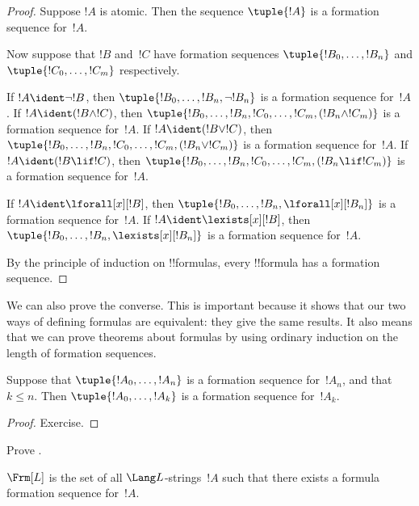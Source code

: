 \begin{proof}
Suppose $!A$ is atomic. Then the sequence $\tuple{!A}$ is a
formation sequence for~$!A$.

Now suppose that $!B$ and~$!C$ have formation sequences
$\tuple{!B_0,\dotsc,!B_n}$ and $\tuple{!C_0,\dotsc,!C_m}$
respectively.

\begin{enumerate}
  If $!A \ident \lnot !B$,
      then $\tuple{!B_0,\dotsc,!B_n,\lnot !B_n}$
      is a formation sequence for~$!A$.
  If $!A \ident (!B \land !C)$,
      then $\tuple{!B_0,\dotsc,!B_n,!C_0,\dotsc,!C_m,(!B_n \land !C_m)}$
      is a formation sequence for~$!A$.
  If $!A \ident (!B \lor !C)$,
      then $\tuple{!B_0,\dotsc,!B_n,!C_0,\dotsc,!C_m,(!B_n \lor !C_m)}$
      is a formation sequence for~$!A$.
  If $!A \ident (!B \lif !C)$,
      then $\tuple{!B_0,\dotsc,!B_n,!C_0,\dotsc,!C_m,(!B_n \lif !C_m)}$
      is a formation sequence for~$!A$.
  
  If $!A \ident \lforall[x][!B]$,
      then $\tuple{!B_0,\dotsc,!B_n,\lforall[x][!B_n]}$
      is a formation sequence for~$!A$.
  If $!A \ident \lexists[x][!B]$,
      then $\tuple{!B_0,\dotsc,!B_n,\lexists[x][!B_n]}$
      is a formation sequence for~$!A$.
\end{enumerate}
By the principle of induction on !!{formula}s,
every !!{formula} has a formation sequence.
\end{proof}

We can also prove the converse. This is important because it shows
that our two ways of defining formulas are equivalent: they give
the same results. It also means that we can prove theorems about
formulas by using ordinary induction on the length of formation
sequences.

\begin{lem}
Suppose that $\tuple{!A_0,\dotsc,!A_n}$ is a formation sequence
for~$!A_n$, and that $k \leq n$. Then $\tuple{!A_0,\dotsc,!A_k}$
is a formation sequence for~$!A_k$.
\end{lem}

\begin{proof}
Exercise.
\end{proof}

\begin{prob}
Prove .
\end{prob}

\begin{thm}
$\Frm[L]$ is the set of all $\Lang L$-strings~$!A$ such that
there exists a formula formation sequence for~$!A$.
\end{thm}

